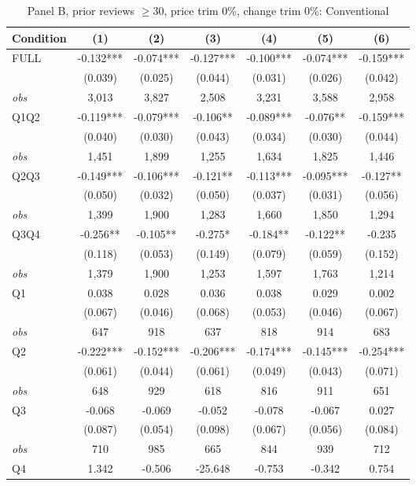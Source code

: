 \documentclass[11pt]{article}
\begin{document}
\begin{table}[!htbp]
\centering
\caption{Panel B, prior reviews $\geq 30$, price trim 0\%, change trim 0\%: Conventional}
\label{tab:b:trim00:reviews30:conventional}
\small
\begin{tabular}{lcccccc}
\toprule
Condition & (1) & (2) & (3) & (4) & (5) & (6) \\
\midrule
FULL & -0.132*** & -0.074*** & -0.127*** & -0.100*** & -0.074*** & -0.159*** \\
 & (0.039) & (0.025) & (0.044) & (0.031) & (0.026) & (0.042) \\
\textit{obs} & 3,013 & 3,827 & 2,508 & 3,231 & 3,588 & 2,958 \\
Q1Q2 & -0.119*** & -0.079*** & -0.106** & -0.089*** & -0.076** & -0.159*** \\
 & (0.040) & (0.030) & (0.043) & (0.034) & (0.030) & (0.044) \\
\textit{obs} & 1,451 & 1,899 & 1,255 & 1,634 & 1,825 & 1,446 \\
Q2Q3 & -0.149*** & -0.106*** & -0.121** & -0.113*** & -0.095*** & -0.127** \\
 & (0.050) & (0.032) & (0.050) & (0.037) & (0.031) & (0.056) \\
\textit{obs} & 1,399 & 1,900 & 1,283 & 1,660 & 1,850 & 1,294 \\
Q3Q4 & -0.256** & -0.105** & -0.275* & -0.184** & -0.122** & -0.235 \\
 & (0.118) & (0.053) & (0.149) & (0.079) & (0.059) & (0.152) \\
\textit{obs} & 1,379 & 1,900 & 1,253 & 1,597 & 1,763 & 1,214 \\
Q1 & 0.038 & 0.028 & 0.036 & 0.038 & 0.029 & 0.002 \\
 & (0.067) & (0.046) & (0.068) & (0.053) & (0.046) & (0.067) \\
\textit{obs} & 647 & 918 & 637 & 818 & 914 & 683 \\
Q2 & -0.222*** & -0.152*** & -0.206*** & -0.174*** & -0.145*** & -0.254*** \\
 & (0.061) & (0.044) & (0.061) & (0.049) & (0.043) & (0.071) \\
\textit{obs} & 648 & 929 & 618 & 816 & 911 & 651 \\
Q3 & -0.068 & -0.069 & -0.052 & -0.078 & -0.067 & 0.027 \\
 & (0.087) & (0.054) & (0.098) & (0.067) & (0.056) & (0.084) \\
\textit{obs} & 710 & 985 & 665 & 844 & 939 & 712 \\
Q4 & 1.342 & -0.506 & -25.648 & -0.753 & -0.342 & 0.754 \\

\end{tabular}
\end{table}
\end{document}
